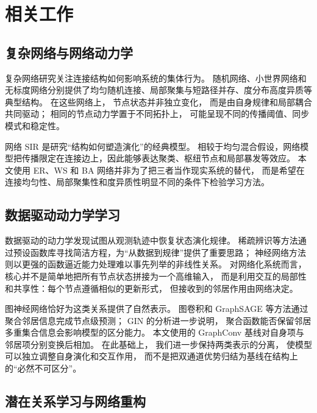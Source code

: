 \section{相关工作}

\subsection{复杂网络与网络动力学}

复杂网络研究关注连接结构如何影响系统的集体行为。
随机网络、小世界网络和无标度网络分别提供了均匀随机连接、局部聚集与短路径并存、度分布高度异质等典型结构\cite{erdos1959,watts1998,barabasi1999}。
在这些网络上，
节点状态并非独立变化，
而是由自身规律和局部耦合共同驱动；
相同的节点动力学置于不同拓扑上，
可能呈现不同的传播阈值、同步模式和稳定性\cite{strogatz2001,albert2002}。

网络 SIR 是研究“结构如何塑造演化”的经典模型。
相较于均匀混合假设，网络模型把传播限定在连接边上，因此能够表达聚类、枢纽节点和局部暴发等效应\cite{pastorsatorras2015}。
本文使用 ER、WS 和 BA 网络并非为了把三者当作现实系统的替代，
而是希望在连接均匀性、局部聚集性和度异质性明显不同的条件下检验学习方法。

\subsection{数据驱动动力学学习}

数据驱动的动力学发现试图从观测轨迹中恢复状态演化规律。
稀疏辨识等方法通过预设函数库寻找简洁方程，为“从数据到规律”提供了重要思路\cite{brunton2016}；
神经网络方法则以更强的函数逼近能力处理难以事先列举的非线性关系。
对网络化系统而言，
核心并不是简单地把所有节点状态拼接为一个高维输入，
而是利用交互的局部性和共享性：每个节点遵循相似的更新形式，
但接收到的邻居作用由网络决定。

图神经网络恰好为这类关系提供了自然表示。
图卷积和 GraphSAGE 等方法通过聚合邻居信息完成节点级预测\cite{kipf2017gcn,hamilton2017}；
GIN 的分析进一步说明，
聚合函数能否保留邻居多重集合信息会影响模型的区分能力\cite{xu2019gin}。
本文使用的 GraphConv 基线对自身项与邻居项分别变换后相加\cite{morris2019,fey2019}。
在此基础上，
我们进一步保持两类表示的分离，
使模型可以独立调整自身演化和交互作用，
而不是把双通道优势归结为基线在结构上的“必然不可区分”。

\subsection{潜在关系学习与网络重构}

